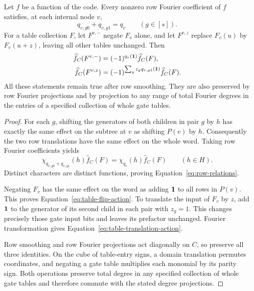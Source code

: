 \begin{lemma}
\label{lem:row-symmetry}
Let $f$ be a function of the code.  Every nonzero row Fourier
coefficient of $f$ satisfies, at each internal node $v$,
\begin{equation}
 q_{v,g0}+q_{v,g1}=q_v\qquad(g\in[s]).
 \label{eq:row-relations}
\end{equation}
For a table collection $F$, let $F^{v,-}$ negate $F_v$ alone,
and let $F^{v,z}$ replace $F_v(u)$ by $F_v(u+z)$, leaving all
other tables unchanged.  Then
\begin{align}
 \widehat f_C(F^{v,-})
   &=(-1)^{q_v(\mathbf 1)}\widehat f_C(F),
   \label{eq:table-flip-action}\\
 \widehat f_C(F^{v,z})
   &=(-1)^{\sum_g z_g q_{v,g1}(\mathbf 1)}\widehat f_C(F).
   \label{eq:table-translation-action}
\end{align}
All these statements remain true after row smoothing.
They are also preserved by row Fourier projections and by
projection to any range of total Fourier degrees in the entries
of a specified collection of whole gate tables.
\end{lemma}

\begin{proof}
For each $g$, shifting the generators of both children in pair
$g$ by $h$ has exactly the same effect on the subtree at $v$ as
shifting $P(v)$ by $h$.  Consequently the two row translations
have the same effect on the whole word.  Taking row Fourier
coefficients yields
\[
 \chi_{q_{v,g0}+q_{v,g1}}(h)\widehat f_C(F)
   =\chi_{q_v}(h)\widehat f_C(F)\qquad(h\in H).
\]
Distinct characters are distinct functions, proving
Equation~\eqref{eq:row-relations}.

Negating $F_v$ has the same effect on the word as adding
$\mathbf 1$ to all rows in $P(v)$.  This proves
Equation~\eqref{eq:table-flip-action}.  To translate the input of
$F_v$ by $z$, add $\mathbf 1$ to the generator of its second child in
each pair with $z_g=1$.  This changes precisely those gate input
bits and leaves its prefactor unchanged.  Fourier transformation
gives Equation~\eqref{eq:table-translation-action}.

Row smoothing and row Fourier projections act diagonally on
$C$, so preserve all three identities.  On the cube of
table-entry signs, a domain translation permutes coordinates,
and negating a gate table multiplies each monomial by its
parity sign.  Both operations preserve total degree in any
specified collection of whole gate tables and therefore
commute with the stated degree projections.
\end{proof}

